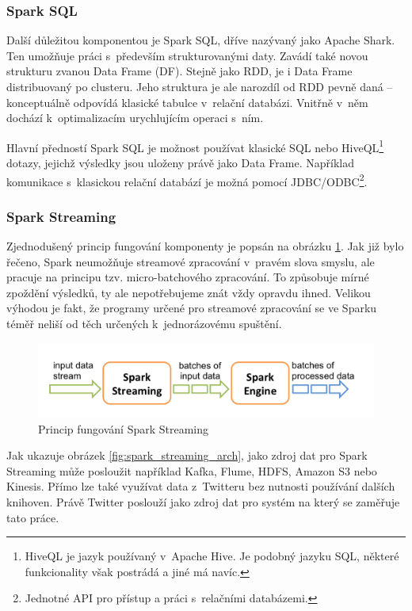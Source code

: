 \documentclass[thesis=B,czech]{FITthesis}[2012/06/26]
\begin{document}
\subsubsection{Spark SQL}
	Další důležitou komponentou je Spark SQL, dříve nazývaný jako Apache Shark. Ten umožňuje práci s~především strukturovanými daty. Zavádí také novou strukturu zvanou Data Frame (DF). Stejně jako RDD, je i Data Frame distribuovaný po clusteru. Jeho struktura je ale narozdíl od RDD pevně daná -- konceptuálně odpovídá klasické tabulce v~relační databázi. Vnitřně v~něm dochází k~optimalizacím urychlujícím operaci s~ním. 
	
	Hlavní předností Spark SQL je možnost používat klasické SQL nebo HiveQL\footnote{HiveQL je jazyk používaný v~Apache Hive. Je podobný jazyku SQL, některé funkcionality však postrádá a jiné má navíc. } dotazy, jejichž výsledky jsou uloženy právě jako Data Frame. Například komunikace s~klasickou relační databází je možná pomocí JDBC/ODBC\footnote{Jednotné API pro přístup a práci s~relačními databázemi.}. 


\subsubsection{Spark Streaming}
	Zjednodušený princip fungování komponenty je popsán na obrázku \ref{fig:spark_streaming_flow}. Jak již bylo řečeno, Spark neumožňuje streamové zpracování v~pravém slova smyslu, ale pracuje na principu tzv. micro-batchového zpracování. To způsobuje mírné zpoždění výsledků, ty ale nepotřebujeme znát vždy opravdu ihned. Velikou výhodou je fakt, že programy určené pro streamové zpracování se ve Sparku téměř neliší od těch určených k~jednorázovému spuštění. 

	\begin{figure}[ht]
    	\centering
    	\includegraphics[width=1\textwidth]{images/spark-streaming-flow.png}
    	\caption{Princip fungování Spark Streaming\cite{streaming-guide}}
    	\label{fig:spark_streaming_flow}
	\end{figure}
	
	Jak ukazuje obrázek \ref{fig:spark_streaming_arch}, jako zdroj dat pro Spark Streaming může posloužit například Kafka, Flume, HDFS, Amazon S3 nebo Kinesis. Přímo lze také využívat data z~Twitteru bez nutnosti používání dalších knihoven. Právě Twitter poslouží jako zdroj dat pro systém na který se zaměřuje tato práce.  
\end{document}
